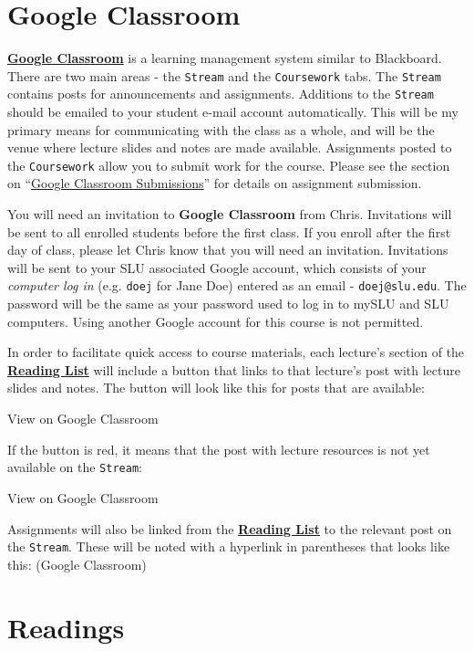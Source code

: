 \documentclass[]{book}
\begin{document}
\hypertarget{google-classroom}{%
\section{Google Classroom}\label{google-classroom}}

\textbf{\href{https://classroom.google.com}{Google Classroom}} is a learning management system similar to Blackboard. There are two main areas - the \texttt{Stream} and the \texttt{Coursework} tabs. The \texttt{Stream} contains posts for announcements and assignments. Additions to the \texttt{Stream} should be emailed to your student e-mail account automatically. This will be my primary means for communicating with the class as a whole, and will be the venue where lecture slides and notes are made available. Assignments posted to the \texttt{Coursework} allow you to submit work for the course. Please see the section on ``\protect\hyperlink{google-classroom-submissions}{Google Classroom Submissions}'' for details on assignment submission.

You will need an invitation to \textbf{Google Classroom} from Chris. Invitations will be sent to all enrolled students before the first class. If you enroll after the first day of class, please let Chris know that you will need an invitation. Invitations will be sent to your SLU associated Google account, which consists of your \emph{computer log in} (e.g. \texttt{doej} for Jane Doe) entered as an email - \texttt{doej@slu.edu}. The password will be the same as your password used to log in to mySLU and SLU computers. Using another Google account for this course is not permitted.

In order to facilitate quick access to course materials, each lecture's section of the \href{/lecture-schedule.html}{\textbf{Reading List}} will include a button that links to that lecture's post with lecture slides and notes. The button will look like this for posts that are available:

View on Google Classroom

If the button is red, it means that the post with lecture resources is not yet available on the \texttt{Stream}:

View on Google Classroom

Assignments will also be linked from the \href{/lecture-schedule.html}{\textbf{Reading List}} to the relevant post on the \texttt{Stream}. These will be noted with a hyperlink in parentheses that looks like this: (Google Classroom)

\hypertarget{readings}{%
\section{Readings}\label{readings}}
\end{document}
